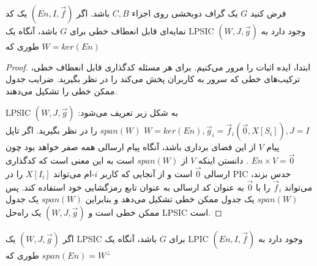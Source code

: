 \begin{example}

\end{example}


\begin{lemma}
    فرض کنید $G$ یک گراف دوبخشی روی اجزاء $C, B$ باشد. اگر $(En, I, \overrightarrow{f})$ یک کد نمایه‌ای قابل انعطاف خطی برای $G$ باشد، آنگاه یک LPSIC $(W, J, \overrightarrow{g})$ وجود دارد به طوری که $W  = ker(En)$
\end{lemma}

\begin{proof}
    ابتدا، ایده اثبات را مرور می‌کنیم. برای هر مسئله کدگذاری قابل انعطاف خطی، ترکیب‌های خطی که سرور به کاربران پخش می‌کند را در نظر بگیرید. ضرایب جدول ممکن خطی را تشکیل می‌دهند.

    LPSIC 
    $(W, J, \overrightarrow{g})$
     به شکل زیر تعریف می‌شود: 
     $W = ker(En), \overrightarrow{g}_i = \overrightarrow{f}_i(\overrightarrow{0}, X[S_i]), J = I$
    $span(W)$
     را در نظر بگیرید. اگر تاپل پیام 
     $V$
      از این فضای برداری باشد، آنگاه پیام ارسالی همه صفر خواهد بود چون 
      $En \times V = \overrightarrow{0}$
      . دانستن اینکه 
      $V$ از $span(W)$
       است به این معنی است که کدگذاری ارسالی 
      $\overrightarrow{0}$
       است و از آنجایی که کاربر 
       $i$-ام
        می‌تواند 
       $X[I_i]$
        را در PIC حدس بزند، می‌تواند
         $\overrightarrow{f}_i$ 
        را با 
        $\overrightarrow{0}$ 
        به عنوان کد ارسالی به عنوان تابع رمزگشایی خود استفاده کند. پس 
        $span(W)$
         یک جدول ممکن خطی تشکیل می‌دهد و بنابراین 
        $span(W)$
         یک جدول ممکن خطی است و 
        $(W, J, \overrightarrow{g})$ 
        یک راه‌حل
         LPSIC 
        است.
\end{proof}

\begin{lemma}
    اگر
     $(W, J, \overrightarrow{g})$
      یک LPSIC برای $G$ باشد، آنگاه یک
       LPIC $(En, I, \overrightarrow{f})$
        وجود دارد به طوری که
         $span(En) = W^{\bot}$
\end{lemma}

